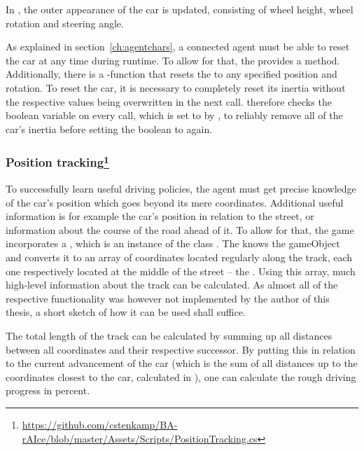 In , the outer appearance of the car is updated, consisting of wheel height, wheel rotation and steering angle.

As explained in section~\ref{ch:agentchars}, a connected agent must be able to reset the car at any time during runtime. To allow for that, the  provides a  method. Additionally, there is a -function that resets the  to any specified position and rotation. To reset the car, it is necessary to completely reset its inertia without the respective values being overwritten in the next  call.  therefore checks the boolean variable  on every call, which is set to  by , to reliably remove all of the car's inertia before setting the boolean to  again.



\subsubsection{Position tracking\footnote{\url{https://github.com/cstenkamp/BA-rAIce/blob/master/Assets/Scripts/PositionTracking.cs}}}
\label{sec:positiontracking}

To successfully learn useful driving policies, the agent must get precise knowledge of the car's position which goes beyond its mere coordinates. Additional useful information is for example the car's position in relation to the street, or information about the course of the road ahead of it. To allow for that, the game incorporates a , which is an instance of the class . The  knows the gameObject  and converts it to an array of coordinates located regularly along the track, each one respectively located at the middle of the street -- the . Using this array, much high-level information about the track can be calculated. As almost all of the respective functionality was however not implemented by the author of this thesis, a short sketch of how it can be used shall suffice.

The total length of the track can be calculated by summing up all distances between all  coordinates and their respective successor. By putting this in relation to the current advancement of the car (which is the sum of all distances up to the coordinates closest to the car, calculated in ), one can calculate the rough driving progress in percent.

